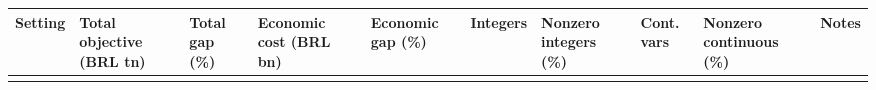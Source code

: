 \documentclass[
  english,
  11pt,
  a4paper,
]{article}
\newcounter{none} %
\begin{document}
{\def\LTcaptype{none} %
\begingroup\footnotesize
\begin{longtable}[]{@{}
  >{\raggedright\arraybackslash}p{}
  >{\raggedright\arraybackslash}p{}
  >{\raggedright\arraybackslash}p{}
  >{\raggedright\arraybackslash}p{}
  >{\raggedright\arraybackslash}p{}
  >{\raggedright\arraybackslash}p{}
  >{\raggedright\arraybackslash}p{}
  >{\raggedright\arraybackslash}p{}
  >{\raggedright\arraybackslash}p{}
  >{\raggedright\arraybackslash}p{}@{}}
\toprule\noalign{}
\begin{minipage}[b]{\linewidth}\raggedright
Setting
\end{minipage} & \begin{minipage}[b]{\linewidth}\raggedright
Total objective (BRL tn)
\end{minipage} & \begin{minipage}[b]{\linewidth}\raggedright
Total gap (\%)
\end{minipage} & \begin{minipage}[b]{\linewidth}\raggedright
Economic cost (BRL bn)
\end{minipage} & \begin{minipage}[b]{\linewidth}\raggedright
Economic gap (\%)
\end{minipage} & \begin{minipage}[b]{\linewidth}\raggedright
Integers
\end{minipage} & \begin{minipage}[b]{\linewidth}\raggedright
Nonzero integers (\%)
\end{minipage} & \begin{minipage}[b]{\linewidth}\raggedright
Cont. vars
\end{minipage} & \begin{minipage}[b]{\linewidth}\raggedright
Nonzero continuous (\%)
\end{minipage} & \begin{minipage}[b]{\linewidth}\raggedright
Notes
\end{minipage} \\
\midrule\noalign{}
\endhead
\bottomrule\noalign{}

\end{longtable}}
\end{document}
